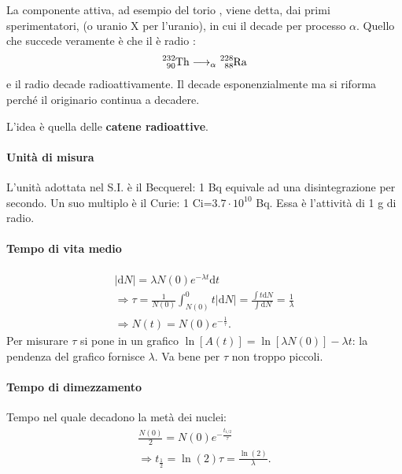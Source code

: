 \documentclass[a4paper,11pt,twoside,openany]{book}
\theoremstyle{definition}
\theoremstyle{plain}
\theoremstyle{plain}
\theoremstyle{definition}
\begin{document}
La componente attiva, ad esempio del torio , viene detta, dai primi sperimentatori,  (o uranio X per l'uranio), in cui il  decade per processo $\alpha$. Quello che succede veramente è che il  è radio :
\begin{equation}\begin{split}
\ce{^{232}_{90}Th}\longrightarrow_{\alpha} \ce{^{228}_{88}Ra}
\end{split}\end{equation}
e il radio decade radioattivamente. Il  decade esponenzialmente ma si riforma perché il  originario continua a decadere.

L'idea è quella delle \textbf{catene radioattive}.

\paragraph{Unità di misura} L'unità adottata nel S.I. è il Becquerel: 1 Bq equivale ad una disintegrazione per secondo. Un suo multiplo è il Curie: 1 Ci=$3.7\cdot 10^{10}$ Bq. Essa è l'attività di 1 g di radio.

\paragraph{Tempo di vita medio} 
\begin{equation}\begin{split}
|\textrm{d}N|=\lambda N\left(0\right)e^{-\lambda t}\textrm{d}t\\
\Longrightarrow \tau=\frac{1}{N\left(0\right)}\int_{N\left(0\right)}^0{t|\textrm{d}N|}=\frac{\int{t\textrm{d}N}}{\int{\textrm{d}N}}=\frac{1}{\lambda}\\
\Longrightarrow N\left(t\right)=N\left(0\right)e^{-\frac{1}{\tau}}.
\end{split}\end{equation}
Per misurare $\tau$ si pone in un grafico $\ln{\left[A\left(t\right)\right]}=\ln{\left[\lambda N\left(0\right)\right]}-\lambda t$: la pendenza del grafico fornisce $\lambda$. Va bene per $\tau$ non troppo piccoli.

\paragraph{Tempo di dimezzamento} Tempo nel quale decadono la metà dei nuclei:
\begin{equation}\begin{split}
\frac{N\left(0\right)}{2}=N\left(0\right)e^{-\frac{t_{1/2}}{\tau}}\\
\Longrightarrow t_{\frac{1}{2}}=\ln{\left(2\right)}\tau=\frac{\ln{\left(2\right)}}{\lambda}.
\end{split}\end{equation}
\end{document}
